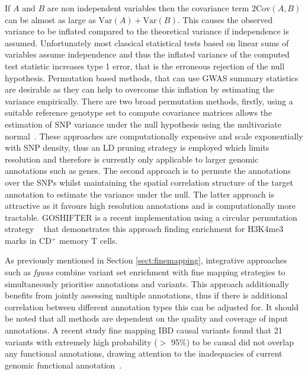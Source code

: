 \documentclass[a4paper,11pt]{report}
\begin{document}
If $A$ and $B$ are non independent variables then the covariance term $2\text{Cov}(A,B)$ can be almost as large as $\text{Var}(A) + \text{Var}(B)$. This causes the observed variance to be inflated compared to the theoretical variance if independence is assumed. Unfortunately most classical statistical tests based on linear sums of variables assume independence and thus the inflated variance of the computed test statistic increases type 1 error, that is the erroneous rejection of the null hypothesis. Permutation based methods, that can use GWAS summary statistics are desirable as they can help to overcome this inflation by estimating the variance empirically. There are two broad permutation methods, firstly, using a suitable reference genotype set to compute covariance matrices allows the estimation of SNP variance under the null hypothesis using the multivariate normal~\citep{LiuMcRaeNyholtEtAl2010,Burren2014-vh}. These approaches are computationally expensive and scale exponentially with SNP density, thus an LD pruning strategy is employed which limits resolution and therefore is currently only applicable to larger genomic annotations such as genes. The second approach is to permute the annotations over the SNPs whilst maintaining the spatial correlation structure of the target annotation to estimate the variance under the null. The latter approach is attractive as it favours high resolution annotations and is computationally more tractable. GOSHIFTER is a recent implementation using a circular permutation strategy ~\citep{Trynka2015-wz} that demonstrates this approach finding enrichment for H3K4me3 marks in CD$^{+}$ memory T cells. 

As previously mentioned in Section \ref{sect:finemapping}, integrative approaches such as \textit{fgwas} combine variant set enrichment with fine mapping strategies to simultaneously prioritise annotations and variants. This approach additionally benefits from jointly assessing multiple annotations, thus if there is additional correlation between different annotation types this can be adjusted for.  It should be noted that all methods are dependent on the quality and coverage of input annotations. A recent study fine mapping IBD causal variants found that 21 variants with extremely high probability ($>$ 95$\%$) to be causal did not overlap any functional annotations, drawing attention to the inadequacies of current genomic functional annotation~\citep{Huang2015-ug}.
\end{document}

